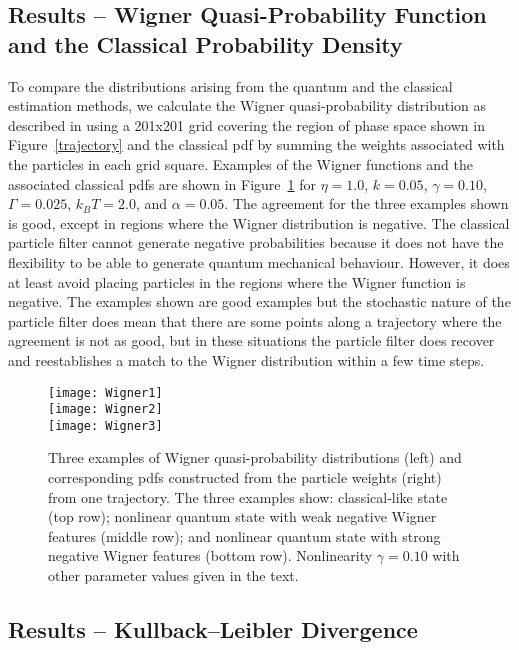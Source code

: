 \documentclass[conference]{IEEEtran}
\begin{document}
\subsection{Results -- Wigner Quasi-Probability Function and the Classical Probability Density}\label{Wigner}

To compare the distributions arising from the quantum and the classical estimation methods, we calculate the Wigner quasi-probability distribution as described in \cite{Til2016} using a 201x201 grid covering the region of phase space shown in Figure~\ref{trajectory} and the classical pdf by summing the weights associated with the particles in each grid square. Examples of the Wigner functions and the associated classical pdfs are shown in Figure~\ref{WQPF} for $\eta = 1.0$, $k = 0.05$, $\gamma = 0.10$, $\Gamma = 0.025$, $k_B T = 2.0$, and $\alpha = 0.05$. The agreement for the three examples shown is good, except in regions where the Wigner distribution is negative. The classical particle filter cannot generate negative probabilities because it does not have the flexibility to be able to generate quantum mechanical behaviour. However, it does at least avoid placing particles in the regions where the Wigner function is negative. The examples shown are good examples but the stochastic nature of the particle filter does mean that there are some points along a trajectory where the agreement is not as good, but in these situations the particle filter does recover and reestablishes a match to the Wigner distribution within a few time steps. 
\begin{figure}[htbp]
       \centering
		\texttt{[image: Wigner1]} \\
		\texttt{[image: Wigner2]} \\
		\texttt{[image: Wigner3]}
	\caption{\label{WQPF} Three examples of Wigner quasi-probability distributions (left) and corresponding pdfs constructed from the particle weights (right) from one trajectory. The three examples show: classical-like state (top row); nonlinear quantum state with weak negative Wigner features (middle row); and nonlinear quantum state with strong negative Wigner features (bottom row). Nonlinearity $\gamma = 0.10$ with other parameter values  given in the text.}
\end{figure}

\subsection{Results -- Kullback–Leibler Divergence}\label{KLdiv}
\end{document}
